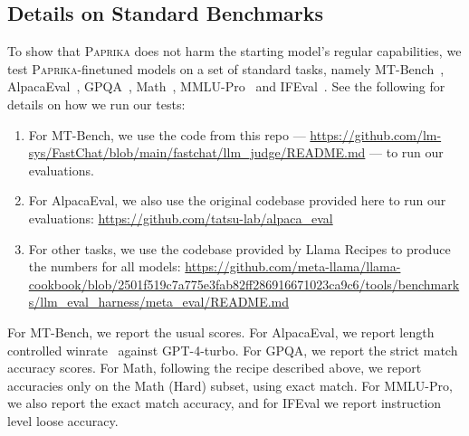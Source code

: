 \documentclass{article}
\newcommand{\ours}[1]{\textsc{Paprika}}
\theoremstyle{plain}
\theoremstyle{definition}
\theoremstyle{remark}
\begin{document}
\subsection{Details on Standard Benchmarks} \label{appendix:standard_evaluations}
To show that \ours{} does not harm the starting model's regular capabilities, we test \ours{}-finetuned models on a set of standard tasks, namely MT-Bench~\citep{zheng2023judgingllmasajudgemtbenchchatbot,kwan2024mt}, AlpacaEval~\citep{dubois2023alpacafarm,dubois2024length,alpaca_eval}, GPQA~\citep{rein2023gpqagraduatelevelgoogleproofqa}, Math~\citep{hendrycks2021measuringmathematicalproblemsolving}, MMLU-Pro~\citep{wang2024mmluprorobustchallengingmultitask} and IFEval~\citep{zhou2023instructionfollowingevaluationlargelanguage}. See the following for details on how we run our tests:
\begin{enumerate}
    \item For MT-Bench, we use the code from this repo --- \url{https://github.com/lm-sys/FastChat/blob/main/fastchat/llm_judge/README.md} --- to run our evaluations.
    \item For AlpacaEval, we also use the original codebase provided here to run our evaluations: \url{https://github.com/tatsu-lab/alpaca_eval}
    \item For other tasks, we use the codebase provided by Llama Recipes to produce the numbers for all models: \url{https://github.com/meta-llama/llama-cookbook/blob/2501f519c7a775e3fab82ff286916671023ca9c6/tools/benchmarks/llm_eval_harness/meta_eval/README.md}
\end{enumerate}
For MT-Bench, we report the usual scores. For AlpacaEval, we report length controlled winrate~\cite{dubois2024length} against GPT-4-turbo. For GPQA, we report the strict match accuracy scores. For Math, following the recipe described above, we report accuracies only on the Math (Hard) subset, using exact match. For MMLU-Pro, we also report the exact match accuracy, and for IFEval we report instruction level loose accuracy.
\end{document}
